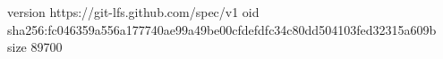 version https://git-lfs.github.com/spec/v1
oid sha256:fc046359a556a177740ae99a49be00cfdefdfc34c80dd504103fed32315a609b
size 89700
